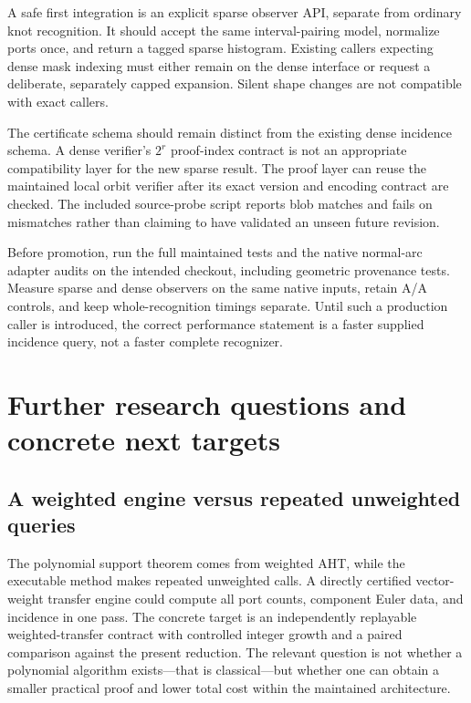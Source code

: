 \documentclass[11pt,letterpaper]{article}
\begin{document}
A safe first integration is an explicit sparse observer API, separate from
ordinary knot recognition. It should accept the same interval-pairing model,
normalize ports once, and return a tagged sparse histogram. Existing callers
expecting dense mask indexing must either remain on the dense interface or
request a deliberate, separately capped expansion. Silent shape changes are
not compatible with exact callers.

The certificate schema should remain distinct from the existing dense
incidence schema. A dense verifier's $2^r$ proof-index contract is not an
appropriate compatibility layer for the new sparse result. The proof layer
can reuse the maintained local orbit verifier after its exact version and
encoding contract are checked. The included source-probe script reports blob
matches and fails on mismatches rather than claiming to have validated an
unseen future revision.

Before promotion, run the full maintained tests and the native normal-arc
adapter audits on the intended checkout, including geometric provenance tests.
Measure sparse and dense observers on the same native inputs, retain A/A
controls, and keep whole-recognition timings separate. Until such a production
caller is introduced, the correct performance statement is a faster supplied
incidence query, not a faster complete recognizer.

\section{Further research questions and concrete next targets}
\label{sec:future}

\subsection{A weighted engine versus repeated unweighted queries}
The polynomial support theorem comes from weighted AHT, while the executable
method makes repeated unweighted calls. A directly certified vector-weight
transfer engine could compute all port counts, component Euler data, and
incidence in one pass. The concrete target is an independently replayable
weighted-transfer contract with controlled integer growth and a paired
comparison against the present reduction. The relevant question is not
whether a polynomial algorithm exists---that is classical---but whether one
can obtain a smaller practical proof and lower total cost within the
maintained architecture.
\end{document}
